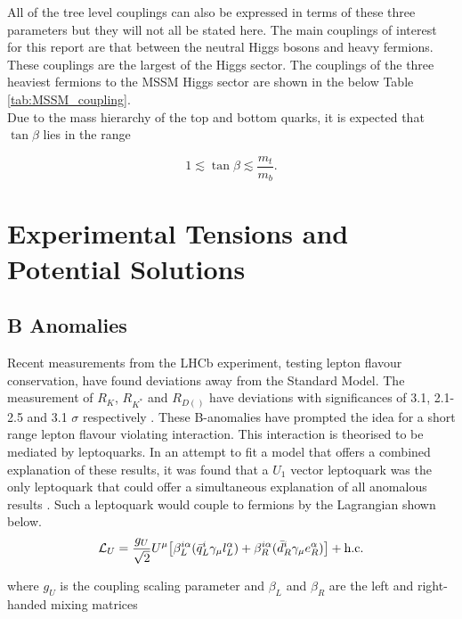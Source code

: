 All of the tree level couplings can also be expressed in terms of these three parameters but they will not all be stated here. The main couplings of interest for this report are that between the neutral Higgs bosons and heavy fermions. These couplings are the largest of the Higgs sector. The couplings of the three heaviest fermions to the MSSM Higgs sector are shown in the below Table \ref{tab:MSSM_coupling}. \\

Due to the mass hierarchy of the top and bottom quarks, it is expected that \(\tan\beta\) lies in the range

\begin{equation}
    1 \lesssim \tan\beta \lesssim \frac{m_t}{m_b}.
\end{equation}


\section{Experimental Tensions and Potential Solutions}

\subsection{B Anomalies}

Recent measurements from the LHCb experiment, testing lepton flavour conservation, have found deviations away from the Standard Model. The measurement of $R_{K}$, $R_{K^{*}}$ and $R_{D(^{})}$ have deviations with significances of 3.1, 2.1-2.5 and 3.1 $\sigma$ respectively \cite{Rk,Rkstar,Rd}. These B-anomalies have prompted the idea for a short range lepton flavour violating interaction. This interaction is theorised to be mediated by leptoquarks. In an attempt to fit a model that offers a combined explanation of these results, it was found that a $U_{1}$ vector leptoquark was the only leptoquark that could offer a simultaneous explanation of all anomalous results \cite{leptoquark}. Such a leptoquark would couple to fermions by the Lagrangian shown below. \\

\begin{equation}
\mathcal{L}_{U} = \frac{g_{U}}{\sqrt{2}} U^{\mu} \big[ \beta_{L}^{i\alpha}( \bar{q}_{L}^{i} \gamma_{\mu} l_{L}^{\alpha}) + \beta_{R}^{i\alpha}( \bar{d}_{R}^{i} \gamma_{\mu} e_{R}^{\alpha}) \big] + \text{h.c.}
\end{equation}

where $g_{U}$ is the coupling scaling parameter and $\beta_{L}$ and $\beta_{R}$ are the left and right-handed mixing matrices

